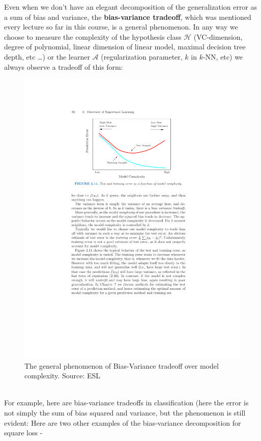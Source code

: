 \documentclass[11pt]{article}
\newcommand{\Ac}{\mathcal{A}}
\newcommand{\Hc}{\mathcal{H}}
\begin{document}
Even when we don't have an elegant decomposition of the generalization error as
a sum of bias and variance, the {\bf bias-variance tradeoff}, which was 
mentioned every lecture so far in this course, is a general phenomenon. 
In any way we choose to measure the complexity of the hypothesis class $\Hc$
(VC-dimension, degree of polynomial, linear dimension of linear model, maximal
  decision tree
depth, etc \ldots) 
or
the learner $\Ac$  (regularization parameter, $k$ in $k$-NN, etc) we always
observe a tradeoff of this form:

\begin{figure}[H]
  \centering
  \includegraphics[width=4.5in]{ESL_bias_variance.pdf}
  \caption{The general phenomenon of Bias-Variance tradeoff over model
  complexity. Source: ESL}
\end{figure}
~\\
For example, here are bias-variance tradeoffs in classification (here the error
  is not simply the sum of bias squared and variance, but the phenomenon is
  still evident:
  Here are two other examples of the bias-variance decomposition for square loss - 
\end{document}
